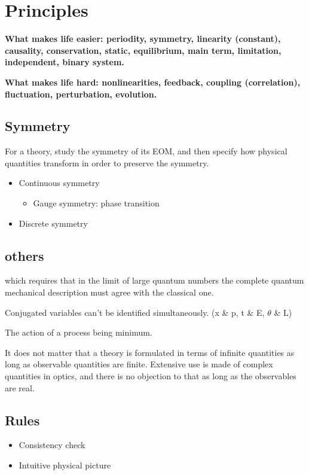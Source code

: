 \section{Principles}
\textbf{What makes life easier: periodity, symmetry, linearity (constant), causality, conservation, static, equilibrium, main term, limitation, independent, binary system.}

\textbf{What makes life hard: nonlinearities, feedback, coupling (correlation), fluctuation, perturbation, evolution.}

\subsection{Symmetry}
For a theory, study the symmetry of its EOM, and then specify how physical quantities transform in order to preserve the symmetry.
\begin{itemize}
    \item Continuous symmetry
	\begin{itemize}
	    \item Gauge symmetry: phase transition
	\end{itemize}
    \item Discrete symmetry
\end{itemize}




\subsection{others}
\begin{description}[style=nextline]
    \item[correspondence principle]
	which requires that in the limit of large quantum numbers the 
	complete quantum mechanical description must agree with the 
	classical one.
    \item[Uncertainty principle]
	Conjugated variables can't be identified simultaneously. (x \& p, t \& E, $\theta$ \& L)
    \item[Minimum Action principle]
	The action of a process being minimum.
    \item[Practical principle]
	It does not matter that a theory is formulated in terms of infinite quantities as long as observable quantities are finite. Extensive use is made of complex quantities in optics, and there is no objection to that as long as the observables are real.
\end{description}

\subsection{Rules}
\begin{itemize}
    \item Consistency check
    \item Intuitive physical picture
\end{itemize}
